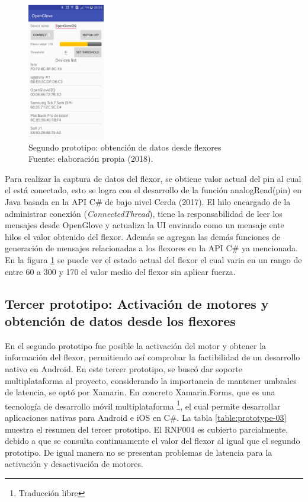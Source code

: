 \begin{figure}[H]
	\centering
	\captionsetup{justification=centering}
   	\includegraphics[width=0.3\textwidth]{images/chapter03/02-prototype.png} 
        \caption[Segundo prototipo: obtención de datos desde flexores]{Segundo prototipo: obtención de datos desde flexores \\ Fuente: elaboración propia (2018).}
    \label{fig:prototype-02}
\end{figure}

Para realizar la captura de datos del flexor, se obtiene valor actual del pin al cual el está conectado, esto se logra con el desarrollo de la función analogRead(pin) en Java basada en la API C\# de bajo nivel Cerda (2017). El hilo encargado de la administrar conexión (\textit{ConnectedThread}), tiene la responsabilidad de leer los mensajes desde OpenGlove y actualiza la UI enviando como un mensaje ente hilos el valor obtenido del flexor. Además se agregan las demás funciones de generación de mensajes relacionadas a los flexores en la API C\# ya mencionada. En la figura \ref{fig:prototype-02} se puede ver el estado actual del flexor el cual varia en un rango de entre 60 a 300 y 170 el valor medio del flexor sin aplicar fuerza.

\subsection{Tercer prototipo: Activación de motores y obtención de datos desde los flexores }
\label{tercer-prototipo}
En el segundo prototipo fue posible la activación del motor y obtener la información del flexor, permitiendo así comprobar la factibilidad de un desarrollo nativo en Android. En este tercer prototipo, se buscó dar soporte multiplataforma al proyecto, considerando la importancia de mantener umbrales de latencia, se optó por Xamarin. En concreto Xamarin.Forms,  que es una tecnología de desarrollo móvil multiplataforma \footnote{Traducción libre}, el cual permite desarrollar aplicaciones nativas para Android e iOS en C\#. La tabla \ref{table:prototype-03} muestra el resumen del tercer prototipo. El RNF004 es cubierto parcialmente, debido a que se consulta continuamente el valor del flexor al igual que el segundo prototipo. De igual manera no se presentan problemas de latencia para la activación y desactivación de motores.


